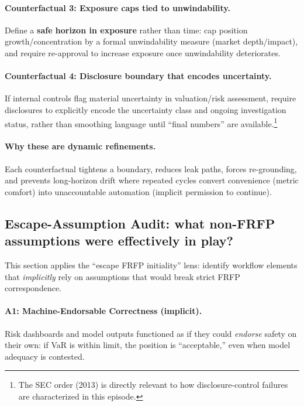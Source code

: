 \paragraph{Counterfactual 3: Exposure caps tied to unwindability.}
Define a \textbf{safe horizon in exposure} rather than time: cap position growth/concentration by a formal unwindability measure (market depth/impact), and require re-approval to increase exposure once unwindability deteriorates.

\paragraph{Counterfactual 4: Disclosure boundary that encodes uncertainty.}
If internal controls flag material uncertainty in valuation/risk assessment, require disclosures to explicitly encode the uncertainty class and ongoing investigation status, rather than smoothing language until “final numbers” are available.\footnote{The SEC order (2013) is directly relevant to how disclosure-control failures are characterized in this episode.}

\paragraph{Why these are dynamic refinements.}
Each counterfactual tightens a boundary, reduces leak paths, forces re-grounding, and prevents long-horizon drift where repeated cycles convert convenience (metric comfort) into unaccountable automation (implicit permission to continue).

\subsection{Escape-Assumption Audit: what non-FRFP assumptions were effectively in play?}
\label{subsec:lw-escape-assumptions}

This section applies the “escape FRFP initiality” lens: identify workflow elements that \emph{implicitly} rely on assumptions that would break strict FRFP correspondence.

\paragraph{A1: Machine-Endorsable Correctness (implicit).}
Risk dashboards and model outputs functioned as if they could \emph{endorse} safety on their own: if VaR is within limit, the position is “acceptable,” even when model adequacy is contested.

